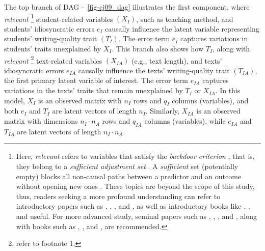\documentclass[
  authoryear,
  review,
  1p]{elsarticle}
\begin{document}
The top branch of DAG -~\ref{fig-cj09_dag} illustrates the first
component, where \emph{relevant} \footnote{Here, \emph{relevant} refers
  to variables that satisfy the \emph{backdoor criterion} \citep[pp
  37]{Neal_2020}, that is, they belong to a \emph{sufficient adjustment
  set} \citep{Pearl_2009, Pearl_et_al_2016, Morgan_et_al_2014}. A
  \emph{sufficient} set (potentially empty) blocks all non-causal paths
  between a predictor and an outcome without opening new ones
  \citep{Pearl_2009}. These topics are beyond the scope of this study,
  thus, readers seeking a more profound understanding can refer to
  introductory papers such as \citet{Pearl_2010}, \citet{Rohrer_2018},
  \citet{Pearl_2019}, and \citet{Cinelli_et_al_2020}, as well as
  introductory books like \citet{Pearl_et_al_2018}, \citet{Neal_2020},
  and \citet{McElreath_2020} useful. For more advanced study, seminal
  papers such as \citet{Neyman_et_al_1923}, \citet{Rubin_1974},
  \citet{Spirtes_et_al_1991}, and \citet{Sekhon_2009}, along with books
  such as \citet{Pearl_2009}, \citet{Morgan_et_al_2014}, and
  \citet{Hernan_et_al_2020}, are recommended.} student-related variables
\((X_{I})\), such as teaching method, and students' idiosyncratic errors
\(e_{I}\) causally influence the latent variable representing students'
writing-quality trait \((T_{I})\). The error term \(e_{I}\) captures
variations in students' traits unexplained by \(X_{I}\). This branch
also shows how \(T_{I}\), along with \emph{relevant} \footnote{refer to
  footnote 1.} text-related variables \((X_{IA})\) (e.g., text length),
and texts' idiosyncratic errors \(e_{IA}\) causally influence the texts'
writing-quality trait \((T_{IA})\), the first primary latent variable of
interest. The error term \(e_{IA}\) captures variations in the texts'
traits that remain unexplained by \(T_{I}\) or \(X_{IA}\). In this
model, \(X_{I}\) is an observed matrix with \(n_{I}\) rows and \(q_{I}\)
columns (variables), and both \(e_{I}\) and \(T_{I}\) are latent vectors
of length \(n_{I}\). Similarly, \(X_{IA}\) is an observed matrix with
dimensions \(n_{I} \cdot n_{A}\) rows and \(q_{IA}\) columns
(variables), while \(e_{IA}\) and \(T_{IA}\) are latent vectors of
length \(n_{I} \cdot n_{A}\).
\end{document}
